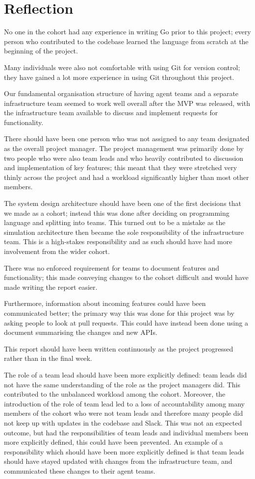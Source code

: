 \section{Reflection}
No one in the cohort had any experience in writing Go prior to this project; every person who contributed to the codebase learned the language from scratch at the beginning of the project.

Many individuals were also not comfortable with using Git for version control; they have gained a lot more experience in using Git throughout this project.

Our fundamental organisation structure of having agent teams and a separate infrastructure team seemed to work well overall after the MVP was released, with the infrastructure team available to discuss and implement requests for functionality.

There should have been one person who was not assigned to any team designated as the overall project manager. The project management was primarily done by two people who were also team leads and who heavily contributed to discussion and implementation of key features; this meant that they were stretched very thinly across the project and had a workload significantly higher than most other members.

The system design architecture should have been one of the first decisions that we made as a cohort; instead this was done after deciding on programming language and splitting into teams. This turned out to be a mistake as the simulation architecture then became the sole responsibility of the infrastructure team. This is a high-stakes responsibility and as such should have had more involvement from the wider cohort.

There was no enforced requirement for teams to document features and functionality; this made conveying changes to the cohort difficult and would have made writing the report easier.

Furthermore, information about incoming features could have been communicated better; the primary way this was done for this project was by asking people to look at pull requests. This could have instead been done using a document summarising the changes and new APIs.

This report should have been written continuously as the project progressed rather than in the final week.

The role of a team lead should have been more explicitly defined: team leads did not have the same understanding of the role as the project managers did. This contributed to the unbalanced workload among the cohort. Moreover, the introduction of the role of team lead led to a loss of accountability among many members of the cohort who were not team leads and therefore many people did not keep up with updates in the codebase and Slack. This was not an expected outcome, but had the responsibilities of team leads and individual members been more explicitly defined, this could have been prevented. An example of a responsibility which should have been more explicitly defined is that team leads should have stayed updated with changes from the infrastructure team, and communicated these changes to their agent teams.

